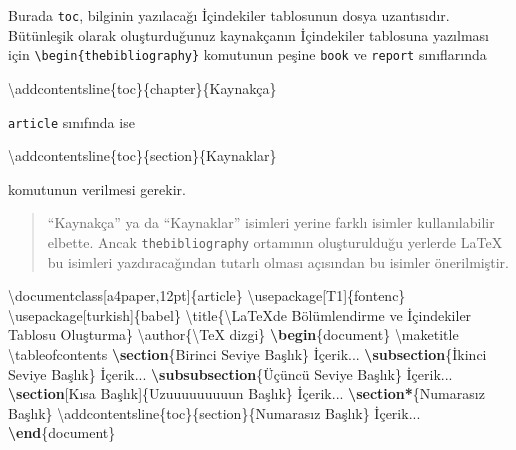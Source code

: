 \documentclass[
  10pt,
]{scrbook}
\newenvironment{Shaded}{}{}
\newcommand{\BuiltInTok}[1]{#1}
\newcommand{\ExtensionTok}[1]{#1}
\newcommand{\FunctionTok}[1]{\textcolor[rgb]{0.02,0.16,0.49}{#1}}
\newcommand{\KeywordTok}[1]{\textcolor[rgb]{0.00,0.44,0.13}{\textbf{#1}}}
\newcommand{\NormalTok}[1]{#1}
\theoremstyle{definition}
\theoremstyle{definition}
\theoremstyle{definition}
\theoremstyle{definition}
\theoremstyle{remark}
\begin{document}
Burada \texttt{toc}, bilginin yazılacağı İçindekiler tablosunun dosya uzantısıdır. Bütünleşik olarak oluşturduğunuz kaynakçanın İçindekiler tablosuna yazılması için \texttt{\textbackslash{}begin\{thebibliography\}} komutunun peşine \texttt{book} ve \texttt{report} sınıflarında

\begin{Shaded}
\begin{Highlighting}[]
\FunctionTok{\textbackslash{}addcontentsline}\NormalTok{\{toc\}\{chapter\}\{Kaynakça\}}
\end{Highlighting}
\end{Shaded}

\texttt{article} sınıfında ise

\begin{Shaded}
\begin{Highlighting}[]
\FunctionTok{\textbackslash{}addcontentsline}\NormalTok{\{toc\}\{section\}\{Kaynaklar\}}
\end{Highlighting}
\end{Shaded}

komutunun verilmesi gerekir.

\begin{quote}
``Kaynakça'' ya da ``Kaynaklar'' isimleri yerine farklı isimler kullanılabilir elbette. Ancak \texttt{thebibliography} ortamının oluşturulduğu yerlerde LaTeX bu isimleri yazdıracağından tutarlı olması açısından bu isimler önerilmiştir.
\end{quote}

\begin{Shaded}
\begin{Highlighting}[]
\BuiltInTok{\textbackslash{}documentclass}\NormalTok{[a4paper,12pt]\{}\ExtensionTok{article}\NormalTok{\}}
\BuiltInTok{\textbackslash{}usepackage}\NormalTok{[T1]\{}\ExtensionTok{fontenc}\NormalTok{\}}
\BuiltInTok{\textbackslash{}usepackage}\NormalTok{[turkish]\{}\ExtensionTok{babel}\NormalTok{\}}
\FunctionTok{\textbackslash{}title}\NormalTok{\{}\FunctionTok{\textbackslash{}LaTeX}\NormalTok{\textquotesingle{}de Bölümlendirme  ve İçindekiler Tablosu Oluşturma\}}
\FunctionTok{\textbackslash{}author}\NormalTok{\{}\FunctionTok{\textbackslash{}TeX}\NormalTok{ dizgi\}}
\KeywordTok{\textbackslash{}begin}\NormalTok{\{}\ExtensionTok{document}\NormalTok{\}}
\FunctionTok{\textbackslash{}maketitle}
\FunctionTok{\textbackslash{}tableofcontents}
\KeywordTok{\textbackslash{}section}\NormalTok{\{Birinci Seviye Başlık\}}
\NormalTok{  İçerik...}
\KeywordTok{\textbackslash{}subsection}\NormalTok{\{İkinci Seviye Başlık\}}
\NormalTok{  İçerik...}
\KeywordTok{\textbackslash{}subsubsection}\NormalTok{\{Üçüncü Seviye Başlık\}}
\NormalTok{  İçerik...}
\KeywordTok{\textbackslash{}section}\NormalTok{[Kısa Başlık]\{Uzuuuuuuuuun Başlık\}}
\NormalTok{  İçerik...}
\KeywordTok{\textbackslash{}section*}\NormalTok{\{Numarasız Başlık\}}
\FunctionTok{\textbackslash{}addcontentsline}\NormalTok{\{toc\}\{section\}\{Numarasız Başlık\}}
\NormalTok{  İçerik...}
\KeywordTok{\textbackslash{}end}\NormalTok{\{}\ExtensionTok{document}\NormalTok{\}}
\end{Highlighting}
\end{Shaded}
\end{document}
